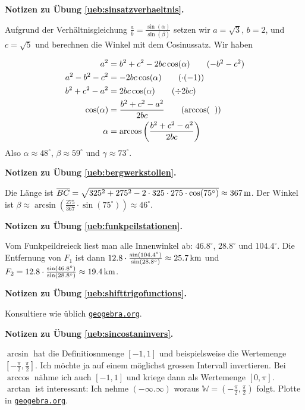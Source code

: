 \documentclass[%
11pt,%
twoside,%
titlepage,%
german,%
headsepline%
]{scrartcl}
\newcommand{\geogebralink}{\href{https://www.geogebra.org/calculator}{\texttt{geogebra.org}}}
\newcommand{\concatueb}[1]{ueb:#1}%
\newcommand{\concatlsg}[1]{lsg:#1}%
\newenvironment{lsg}[1]{%
    \par\noindent\textbf{Notizen zu Übung \ref{\concatueb{#1}}.}%
    \label{\concatlsg{#1}}
}{%
    \par%
}
\begin{document}
\begin{lsg}{sinsatzverhaeltnis}
Aufgrund der Verh\"altnisgleichung $\frac{a}{b}=\frac{\sin(\alpha)}{\sin(\beta)}$ setzen wir $a=\sqrt{3}$, $b=2$, und $c=\sqrt{5}$ und berechnen die Winkel mit dem Cosinussatz. Wir haben

\begin{align*}
a^2 &= b^2+c^2-2bc\cos(\alpha)\tag{$-b^2-c^2$}\\
a^2 - b^2 - c^2 &= -2bc\cos(\alpha)\tag{$\cdot(-1)$}\\
b^2 + c^2 - a^{2} &= 2bc\cos(\alpha)\tag{$\div2bc$}\\
\cos(\alpha) &= \frac{b^2 + c^2 - a^{2}}{2bc}\tag{$\arccos(\phantom{x})$}\\
\alpha &= \arccos\left(\frac{b^2 + c^2 - a^{2}}{2bc}\right)
\end{align*}
Also $\alpha\approx48^{\circ}$, $\beta\approx59^{\circ}$ und $\gamma\approx73^{\circ}$.
\end{lsg}
\begin{lsg}{bergwerkstollen}
Die L\"ange ist $\overline{BC}=\sqrt{325^{2}+275^{2}-2\cdot325\cdot275\cdot\cos(75^\circ)}\approx\unit[367]{m}$. Der Winkel ist $\beta\approx\arcsin(\frac{275}{367}\cdot\sin(75^{\circ}))\approx46^{\circ}$.
\end{lsg}
\begin{lsg}{funkpeilstationen}
Vom Funkpeildreieck liest man alle Innenwinkel ab: $46.8^{\circ}$, $28.8^{\circ}$ und $104.4^{\circ}$. Die Entfernung von $F_{1}$ ist dann $12.8\cdot\frac{\sin(104.4^{\circ})}{\sin(28.8^{\circ})}\approx\unit[25.7]{km}$ und $F_{2}=12.8\cdot\frac{\sin(46.8^{\circ})}{\sin(28.8^{\circ})}\approx\unit[19.4]{km}$.
\end{lsg}
\begin{lsg}{shifttrigofunctions}
Konsultiere wie \"ublich \geogebralink.
\end{lsg}
\begin{lsg}{sincostaninvers}
$\arcsin$ hat die Definitiosnmenge $[-1,1]$ und beispielsweise die Wertemenge $[-\frac{\pi}{2},\frac{\pi}{2}]$. Ich m\"ochte ja auf einem m\"oglichst grossen Intervall invertieren. Bei $\arccos$ n\"ahme ich auch $[-1,1]$ und kriege dann als Wertemenge $[0,\pi]$. $\arctan$ ist interessant: Ich nehme $(-\infty.\infty)$ woraus $\mathbb{W}=(-\frac{\pi}{2},\frac{\pi}{2})$ folgt. Plotte in \geogebralink.
\end{lsg}
\end{document}
